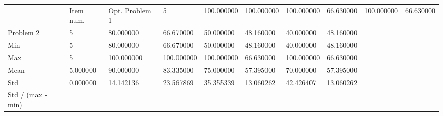 \begin{tabular}{llllllll}
\toprule
 & Item num. & Opt. %
\midrule
Problem 1 & 5 & 100.000000 & 100.000000 & 100.000000 & 66.630000 & 100.000000 & 66.630000 \\
Problem 2 & 5 & 80.000000 & 66.670000 & 50.000000 & 48.160000 & 40.000000 & 48.160000 \\
Min & 5 & 80.000000 & 66.670000 & 50.000000 & 48.160000 & 40.000000 & 48.160000 \\
Max & 5 & 100.000000 & 100.000000 & 100.000000 & 66.630000 & 100.000000 & 66.630000 \\
Mean & 5.000000 & 90.000000 & 83.335000 & 75.000000 & 57.395000 & 70.000000 & 57.395000 \\
Std & 0.000000 & 14.142136 & 23.567869 & 35.355339 & 13.060262 & 42.426407 & 13.060262 \\
Std / (max - min) %
\bottomrule
\end{tabular}
